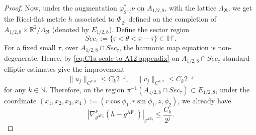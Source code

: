\documentclass[a4paper,11pt]{amsart}
\theoremstyle{definition}
\numberwithin{equation}{section}
\newcommand{\mR} {\mathfrak R}
\DeclareMathOperator{\AF}{AF}
\begin{document}
\begin{proof}
    

    Now, under the augmentation $\varphi_{2^{-j}}^*\nu$ on $A_{1/2,8}$, with the lattice $\Lambda_{\mR}$, we get  the Ricci-flat metric $h$ associated to $\Phi_{2^j}$ defined on the completion of $A_{1/2,8}\times\mathbb{R}^2/\Lambda_{\mR}$ (denoted by $E_{1/2,8}$).  Define the sector region
    $$Sec_\tau:=\{\tau<\theta<\pi-\tau\}\subset\mathbb{H}^\circ.$$
    For a fixed small $\tau$, over $A_{1/2,8}\cap Sec_\tau$, the harmonic map equation is non-degenerate. Hence, by \eqref{eq:C1a scale to A12 appendix} on $A_{1/2,8}\cap Sec_\tau$ standard elliptic estimates give the improvement 
    \begin{equation}
        \|u_j\|_{C^{k,\alpha}}\leq C_k2^{-j},\quad \|v_j\|_{C^{k,\alpha}}\leq C_k2^{-j}
    \end{equation}
    for any $k\in\mathbb{N}$. Therefore, on the region $\pi^{-1}(A_{1/2,8}\cap Sec_\tau)\subset E_{1/2,8}$, under the coordinate $(x_1,x_2,x_3,x_4):=(r\cos\phi_1,r\sin\phi_1,z,\phi_2)$, we already have
    $$|\nabla_{g^{\AF_0}}^k(h-g^{\AF_0})|_{g^{\AF_0}}\leq \frac{C_k}{2^j}.$$
    
    
    

\end{proof}
\end{document}
